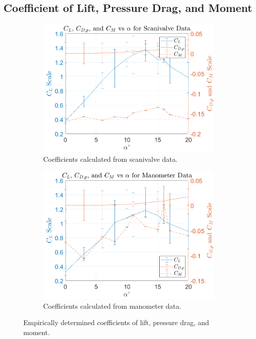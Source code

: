 \documentclass[runningheads]{llncs}
\begin{document}
\subsection{Coefficient of Lift, Pressure Drag, and Moment}

\begin{figure}
    \centering
    \begin{subfigure}[b]{0.45\textwidth}
         \centering
         \includegraphics[width=\textwidth]{figures/scanivalve_cl_cd_cm.png}
         \caption{Coefficients calculated from scanivalve data.}
         \label{fig:scani_coeff}
     \end{subfigure}
     \begin{subfigure}[b]{0.45\textwidth}
         \centering
         \includegraphics[width=\textwidth]{figures/manometer_cl_cd_cm.png}
         \caption{Coefficients calculated from manometer data.}
         \label{fig:mano_coeff}
     \end{subfigure}
    \caption{Empirically determined coefficients of lift, pressure drag, and moment.}
    \label{fig:coeffs}
\end{figure}
\end{document}
